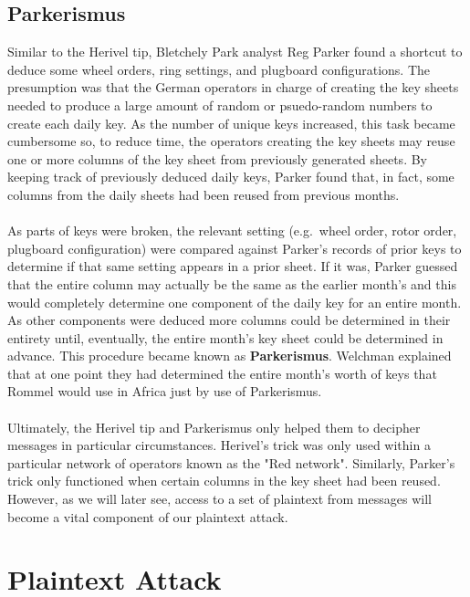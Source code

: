 \subsection{Parkerismus}
Similar to the Herivel tip, Bletchely Park analyst Reg Parker found a
shortcut to deduce some wheel orders, ring settings, and plugboard
configurations. The presumption was that the German operators in
charge of creating the key sheets needed to produce a large amount of
random or psuedo-random numbers to create each daily key. As the
number of unique keys increased, this task became cumbersome so, to
reduce time, the operators creating the key sheets may reuse one or
more columns of the key sheet from previously generated sheets. By
keeping track of previously deduced daily keys, Parker found that, in
fact, some columns from the daily sheets had been reused from
previous months.
\\\\As parts of keys were broken, the relevant setting
(e.g.\ wheel order, rotor order, plugboard configuration) were compared
against Parker's records of prior keys to determine if that same
setting appears in a prior sheet. If it was, Parker guessed that the
entire column may actually be the same as the earlier month's and
this would completely determine one component of the daily key for an
entire month. As other components were deduced more columns could be
determined in their entirety until, eventually, the entire month's
key sheet could be determined in advance. This procedure became known
as {\bf{Parkerismus}}. Welchman explained that at one point they had
determined the entire month's worth of keys that Rommel would use in
Africa just by use of Parkerismus.
\\\\Ultimately, the Herivel tip and Parkerismus only helped them to
decipher messages in particular circumstances. Herivel's trick was
only used within a
particular network of operators known as the "Red network". Similarly,
Parker's trick only functioned when certain columns in the key sheet
had been reused. However,
as we will later see, access to a set of plaintext from messages will
become a vital component of our plaintext attack.

\section{Plaintext Attack}

